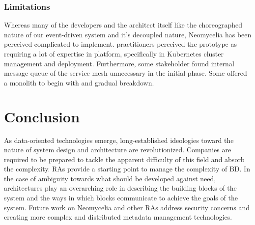 \documentclass[conference]{IEEEtran}
\begin{document}
\subsubsection{Limitations}

Whereas many of the developers and the architect itself like the choreographed nature of our event-driven system and it's decoupled nature, Neomycelia has been perceived complicated to implement. practitioners perceived the prototype as requiring a lot of expertise in platform, specifically in Kubernetes cluster management and deployment. Furthermore, some stakeholder found internal message queue of the service mesh unnecessary in the initial phase. Some offered a monolith to begin with and gradual breakdown.

\section{Conclusion}

As data-oriented technologies emerge, long-established ideologies toward the nature of system design and architecture are revolutionized. Companies are required to be prepared to tackle the apparent difficulty of this field and absorb the complexity. RAs provide a starting point to manage the complexity of BD. In the case of ambiguity towards what should be developed against need, architectures play an overarching role in describing the building blocks of the system and the ways in which blocks communicate to achieve the goals of the system. Future work on Neomycelia and other RAs address security concerns and creating more complex and distributed metadata management technologies.



\end{document}
